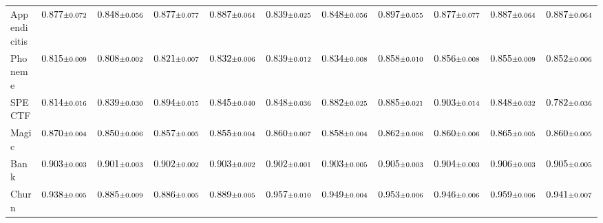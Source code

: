 \begin{table}[!t]
{\begin{tabular}{lcccccccccc}
Appendicitis & $0.877 \text{\scriptsize$\pm$0.072}$ & $0.848 \text{\scriptsize$\pm$0.056}$ & $0.877 \text{\scriptsize$\pm$0.077}$ & $0.887 \text{\scriptsize$\pm$0.064}$ & $0.839 \text{\scriptsize$\pm$0.025}$ & $0.848 \text{\scriptsize$\pm$0.056}$ & $0.897 \text{\scriptsize$\pm$0.055}$ & $0.877 \text{\scriptsize$\pm$0.077}$ & $0.887 \text{\scriptsize$\pm$0.064}$ & $0.887 \text{\scriptsize$\pm$0.064}$ \\
Phoneme & $0.815 \text{\scriptsize$\pm$0.009}$ & $0.808 \text{\scriptsize$\pm$0.002}$ & $0.821 \text{\scriptsize$\pm$0.007}$ & $0.832 \text{\scriptsize$\pm$0.006}$ & $0.839 \text{\scriptsize$\pm$0.012}$ & $0.834 \text{\scriptsize$\pm$0.008}$ & $0.858 \text{\scriptsize$\pm$0.010}$ & $0.856 \text{\scriptsize$\pm$0.008}$ & $0.855 \text{\scriptsize$\pm$0.009}$ & $0.852 \text{\scriptsize$\pm$0.006}$ \\
SPECTF & $0.814 \text{\scriptsize$\pm$0.016}$ & $0.839 \text{\scriptsize$\pm$0.030}$ & $0.894 \text{\scriptsize$\pm$0.015}$ & $0.845 \text{\scriptsize$\pm$0.040}$ & $0.848 \text{\scriptsize$\pm$0.036}$ & $0.882 \text{\scriptsize$\pm$0.025}$ & $0.885 \text{\scriptsize$\pm$0.021}$ & $0.903 \text{\scriptsize$\pm$0.014}$ & $0.848 \text{\scriptsize$\pm$0.032}$ & $0.782 \text{\scriptsize$\pm$0.036}$ \\
Magic & $0.870 \text{\scriptsize$\pm$0.004}$ & $0.850 \text{\scriptsize$\pm$0.006}$ & $0.857 \text{\scriptsize$\pm$0.005}$ & $0.855 \text{\scriptsize$\pm$0.004}$ & $0.860 \text{\scriptsize$\pm$0.007}$ & $0.858 \text{\scriptsize$\pm$0.004}$ & $0.862 \text{\scriptsize$\pm$0.006}$ & $0.860 \text{\scriptsize$\pm$0.006}$ & $0.865 \text{\scriptsize$\pm$0.005}$ & $0.860 \text{\scriptsize$\pm$0.005}$ \\
Bank & $0.903 \text{\scriptsize$\pm$0.003}$ & $0.901 \text{\scriptsize$\pm$0.003}$ & $0.902 \text{\scriptsize$\pm$0.002}$ & $0.903 \text{\scriptsize$\pm$0.002}$ & $0.902 \text{\scriptsize$\pm$0.001}$ & $0.903 \text{\scriptsize$\pm$0.005}$ & $0.905 \text{\scriptsize$\pm$0.003}$ & $0.904 \text{\scriptsize$\pm$0.003}$ & $0.906 \text{\scriptsize$\pm$0.003}$ & $0.905 \text{\scriptsize$\pm$0.005}$ \\
Churn & $0.938 \text{\scriptsize$\pm$0.005}$ & $0.885 \text{\scriptsize$\pm$0.009}$ & $0.886 \text{\scriptsize$\pm$0.005}$ & $0.889 \text{\scriptsize$\pm$0.005}$ & $0.957 \text{\scriptsize$\pm$0.010}$ & $0.949 \text{\scriptsize$\pm$0.004}$ & $0.953 \text{\scriptsize$\pm$0.006}$ & $0.946 \text{\scriptsize$\pm$0.006}$ & $0.959 \text{\scriptsize$\pm$0.006}$ & $0.941 \text{\scriptsize$\pm$0.007}$ \\
\bottomrule
\end{tabular}
}
\end{table}

